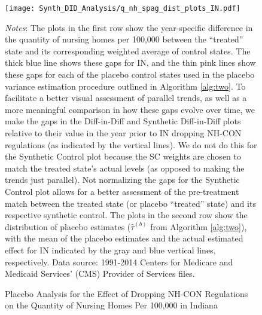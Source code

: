\documentclass[../Main.tex]{subfiles}
\begin{document}
\newpage
\begin{figure}[t]
	\begin{center}
	\caption{\label{fig: q_nh_spag_plots_in} \centering Placebo Analysis for the Effect of Dropping NH-CON Regulations on the Quantity of Nursing Homes Per 100,000 in Indiana}
    \texttt{[image: Synth\_DID\_Analysis/q\_nh\_spag\_dist\_plots\_IN.pdf]}
    \end{center}
    \footnotesize
		\textit{Notes}: The plots in the first row show the year-specific difference in the quantity of nursing homes per 100,000 between the ``treated'' state and its corresponding weighted average of control states. The thick blue line shows these gaps for IN, and the thin pink lines show these gaps for each of the placebo control states used in the placebo variance estimation procedure outlined in Algorithm \ref{alg:two}. To facilitate a better visual assessment of parallel trends, as well as a more meaningful comparison in how these gaps evolve over time, we make the gaps in the Diff-in-Diff and Synthetic Diff-in-Diff plots relative to their value in the year prior to IN dropping NH-CON regulations (as indicated by the vertical lines). We do not do this for the Synthetic Control plot because the SC weights are chosen to match the treated state's actual levels (as opposed to making the trends just parallel). Not normalizing the gaps for the Synthetic Control plot allows for a better assessment of the pre-treatment match between the treated state (or placebo ``treated'' state) and its respective synthetic control. The plots in the second row show the distribution of placebo estimates ($\hat{\tau}^{(b)}$ from Algorithm \ref{alg:two}), with the mean of the placebo estimates and the actual estimated effect for IN indicated by the gray and blue vertical lines, respectively. Data source: 1991-2014 Centers for Medicare and Medicaid Services’ (CMS) Provider of Services files.
\end{figure}
\clearpage
\end{document}
